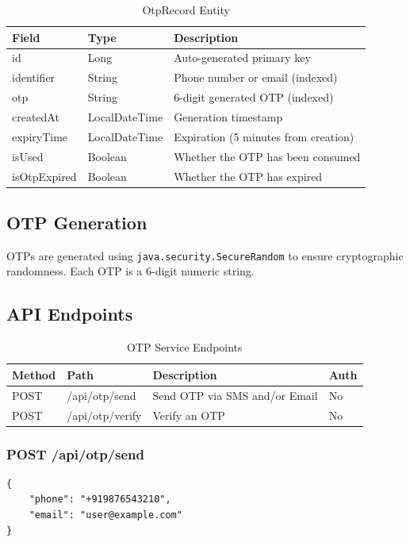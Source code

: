 \documentclass[12pt,a4paper]{report}
\begin{document}
\begin{table}[H]
\centering
\caption{OtpRecord Entity}
\begin{tabularx}{\textwidth}{llX}
\toprule
\textbf{Field} & \textbf{Type} & \textbf{Description} \\
\midrule
id & Long & Auto-generated primary key \\
identifier & String & Phone number or email (indexed) \\
otp & String & 6-digit generated OTP (indexed) \\
createdAt & LocalDateTime & Generation timestamp \\
expiryTime & LocalDateTime & Expiration (5 minutes from creation) \\
isUsed & Boolean & Whether the OTP has been consumed \\
isOtpExpired & Boolean & Whether the OTP has expired \\
\bottomrule
\end{tabularx}
\end{table}

\subsection{OTP Generation}
OTPs are generated using \texttt{java.security.SecureRandom} to ensure cryptographic randomness. Each OTP is a 6-digit numeric string.

\subsection{API Endpoints}

\begin{table}[H]
\centering
\caption{OTP Service Endpoints}
\begin{tabularx}{\textwidth}{llXl}
\toprule
\textbf{Method} & \textbf{Path} & \textbf{Description} & \textbf{Auth} \\
\midrule
POST & /api/otp/send & Send OTP via SMS and/or Email & No \\
POST & /api/otp/verify & Verify an OTP & No \\
\bottomrule
\end{tabularx}
\end{table}

\subsubsection{POST /api/otp/send}
\begin{lstlisting}[style=jsonstyle, caption={OTP Send Request}]
{
    "phone": "+919876543210",
    "email": "user@example.com"
}
\end{lstlisting}
\end{document}
